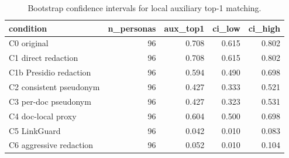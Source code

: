 \begin{table}[t]
\centering
\small
\setlength{\tabcolsep}{3pt}
\caption{Bootstrap confidence intervals for local auxiliary top-1 matching.}
\label{tab:local_aux_bootstrap_ci}
\begin{tabular}{lrrrr}
\toprule
condition & n\_personas & aux\_top1 & ci\_low & ci\_high \\
\midrule
C0 original & 96 & 0.708 & 0.615 & 0.802 \\
C1 direct redaction & 96 & 0.708 & 0.615 & 0.802 \\
C1b Presidio redaction & 96 & 0.594 & 0.490 & 0.698 \\
C2 consistent pseudonym & 96 & 0.427 & 0.333 & 0.521 \\
C3 per-doc pseudonym & 96 & 0.427 & 0.323 & 0.531 \\
C4 doc-local proxy & 96 & 0.604 & 0.500 & 0.698 \\
C5 LinkGuard & 96 & 0.042 & 0.010 & 0.083 \\
C6 aggressive redaction & 96 & 0.052 & 0.010 & 0.104 \\
\bottomrule
\end{tabular}
\end{table}
